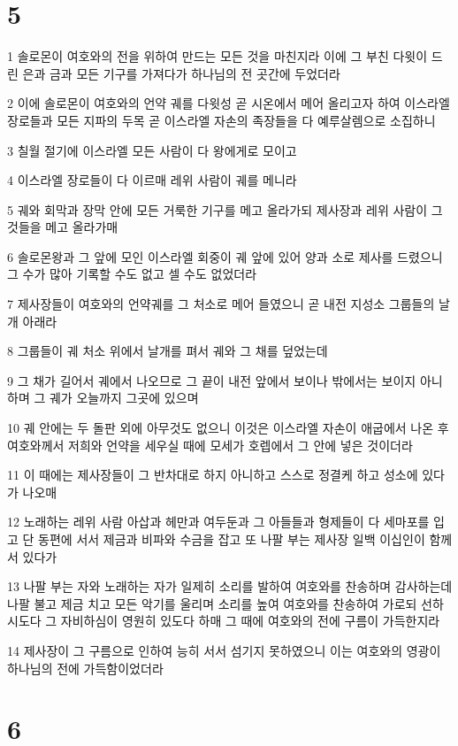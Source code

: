 \chapter{5}

\par 1 솔로몬이 여호와의 전을 위하여 만드는 모든 것을 마친지라 이에 그 부친 다윗이 드린 은과 금과 모든 기구를 가져다가 하나님의 전 곳간에 두었더라
\par 2 이에 솔로몬이 여호와의 언약 궤를 다윗성 곧 시온에서 메어 올리고자 하여 이스라엘 장로들과 모든 지파의 두목 곧 이스라엘 자손의 족장들을 다 예루살렘으로 소집하니
\par 3 칠월 절기에 이스라엘 모든 사람이 다 왕에게로 모이고
\par 4 이스라엘 장로들이 다 이르매 레위 사람이 궤를 메니라
\par 5 궤와 회막과 장막 안에 모든 거룩한 기구를 메고 올라가되 제사장과 레위 사람이 그것들을 메고 올라가매
\par 6 솔로몬왕과 그 앞에 모인 이스라엘 회중이 궤 앞에 있어 양과 소로 제사를 드렸으니 그 수가 많아 기록할 수도 없고 셀 수도 없었더라
\par 7 제사장들이 여호와의 언약궤를 그 처소로 메어 들였으니 곧 내전 지성소 그룹들의 날개 아래라
\par 8 그룹들이 궤 처소 위에서 날개를 펴서 궤와 그 채를 덮었는데
\par 9 그 채가 길어서 궤에서 나오므로 그 끝이 내전 앞에서 보이나 밖에서는 보이지 아니하며 그 궤가 오늘까지 그곳에 있으며
\par 10 궤 안에는 두 돌판 외에 아무것도 없으니 이것은 이스라엘 자손이 애굽에서 나온 후 여호와께서 저희와 언약을 세우실 때에 모세가 호렙에서 그 안에 넣은 것이더라
\par 11 이 때에는 제사장들이 그 반차대로 하지 아니하고 스스로 정결케 하고 성소에 있다가 나오매
\par 12 노래하는 레위 사람 아삽과 헤만과 여두둔과 그 아들들과 형제들이 다 세마포를 입고 단 동편에 서서 제금과 비파와 수금을 잡고 또 나팔 부는 제사장 일백 이십인이 함께 서 있다가
\par 13 나팔 부는 자와 노래하는 자가 일제히 소리를 발하여 여호와를 찬송하며 감사하는데 나팔 불고 제금 치고 모든 악기를 울리며 소리를 높여 여호와를 찬송하여 가로되 선하시도다 그 자비하심이 영원히 있도다 하매 그 때에 여호와의 전에 구름이 가득한지라
\par 14 제사장이 그 구름으로 인하여 능히 서서 섬기지 못하였으니 이는 여호와의 영광이 하나님의 전에 가득함이었더라

\chapter{6}

